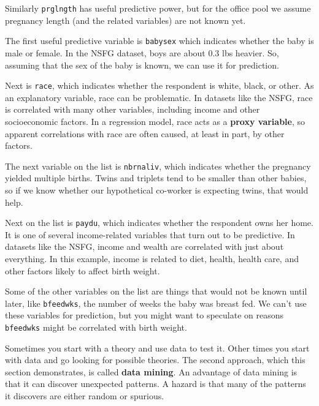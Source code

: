 \documentclass[12pt]{book}
\begin{document}
Similarly \verb"prglngth" has useful predictive power, but for the
office pool we assume pregnancy length (and the related variables)
are not known yet.

The first useful predictive variable is \verb"babysex" which indicates
whether the baby is male or female.  In the NSFG dataset, boys are
about 0.3 lbs heavier.  So, assuming that the sex of the baby is
known, we can use it for prediction.

Next is \verb"race", which indicates whether the respondent is white,
black, or other.  As an explanatory variable, race can be problematic.
In datasets like the NSFG, race is correlated with many other
variables, including income and other socioeconomic factors.  In a
regression model, race acts as a {\bf proxy variable},
so apparent correlations with race are often caused, at least in
part, by other factors.

The next variable on the list is \verb"nbrnaliv", which indicates
whether the pregnancy yielded multiple births.  Twins and triplets
tend to be smaller than other babies, so if we know whether our
hypothetical co-worker is expecting twins, that would help.

Next on the list is \verb"paydu", which indicates whether the
respondent owns her home.  It is one of several income-related
variables that turn out to be predictive.  In datasets like the NSFG,
income and wealth are correlated with just about everything.  In this
example, income is related to diet, health, health care, and other
factors likely to affect birth weight.

Some of the other variables on the list are things that would not
be known until later, like \verb"bfeedwks", the number of weeks
the baby was breast fed.  We can't use these variables for prediction,
but you might want to speculate on reasons
\verb"bfeedwks" might be correlated with birth weight.

Sometimes you start with a theory and use data to test it.  Other
times you start with data and go looking for possible theories.
The second approach, which this section demonstrates, is
called {\bf data mining}.  An advantage of data mining is that it
can discover unexpected patterns.  A hazard is that many of the
patterns it discovers are either random or spurious.
\end{document}
